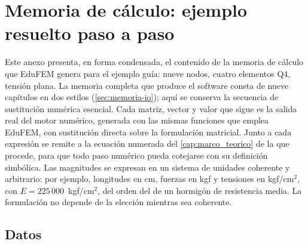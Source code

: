 

\renewcommand{\valE}{225\,000}
\renewcommand{\valDfactor}{234\,375}
\renewcommand{\detJinline}{4{,}7604;\ 3{,}0283;\ 4{,}4717;\ 2{,}7396}
\renewcommand{\Dmat}{\begin{bmatrix}
234\,375{,}00 & 46\,875{,}00 & 0{,}00 \\
46\,875{,}00 & 234\,375{,}00 & 0{,}00 \\
0{,}00 & 0{,}00 & 93\,750{,}00
\end{bmatrix}}

\chapter{Memoria de cálculo: ejemplo resuelto paso a paso}
\label{anexo:memoria}

Este anexo presenta, en forma condensada, el contenido de la memoria de cálculo que EduFEM genera para el ejemplo guía: nueve nodos, cuatro elementos Q4, tensión plana. La memoria completa que produce el software consta de nueve capítulos en dos estilos (\autoref{sec:memoria-io}); aquí se conserva la secuencia de sustitución numérica esencial. Cada matriz, vector y valor que sigue es la salida real del motor numérico, generada con las mismas funciones que emplea EduFEM, con sustitución directa sobre la formulación matricial. Junto a cada expresión se remite a la ecuación numerada del \autoref{cap:marco_teorico} de la que procede, para que todo paso numérico pueda cotejarse con su definición simbólica. Las magnitudes se expresan en un sistema de unidades coherente y arbitrario: por ejemplo, longitudes en cm, fuerzas en kgf y tensiones en kgf/cm$^2$, con $E = \valE$~kgf/cm$^2$, del orden del de un hormigón de resistencia media. La formulación no depende de la elección mientras sea coherente.

\section{Datos}

